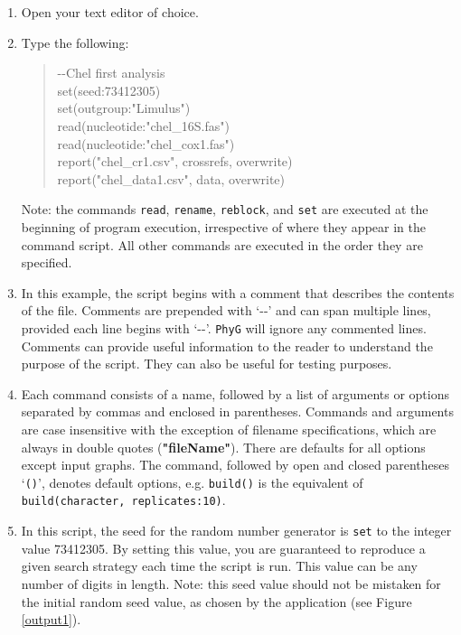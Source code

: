 \documentclass[11pt]{article}
\newcommand{\phyg}{\texttt{PhyG} }
\begin{document}
\begin{enumerate}

\item Open your text editor of choice.

\item Type the following:
	
	\begin{quote}
	-\/-Chel first analysis\\
	set(seed:73412305)\\
	set(outgroup:"Limulus")\\
	read(nucleotide:"chel\_16S.fas")\\
	read(nucleotide:"chel\_cox1.fas")\\
	report("chel\_cr1.csv", crossrefs, overwrite)\\
	report("chel\_data1.csv", data, overwrite)\\
	\end{quote}

Note: the commands \texttt{read}, \texttt{rename}, \texttt{reblock}, and \texttt{set} 
are executed at the beginning of program execution, irrespective of where they 
appear in the command script. All other commands are executed in the order they 
are specified.

\item In this example, the script begins with a comment that describes the 
contents of the file. Comments are prepended with `-{}-' and can span multiple 
lines, provided each line begins with `-{}-'. \phyg will ignore any commented 
lines. Comments can provide useful information to the reader to understand 
the purpose of the script. They can also be useful for testing purposes.

\item Each command consists of a name, followed by a list of arguments or options 
separated by commas and enclosed in parentheses. Commands and arguments are 
case insensitive with the exception of filename specifications, which are always in 
double quotes (\textbf{"fileName"}). There are defaults for all options except 
input graphs. The command, followed by open and closed parentheses `\texttt{()}',
denotes default options, e.g. \texttt{build()} is the equivalent of \texttt{build(character, 
replicates:10)}.

\item In this script, the seed for the random number generator is \texttt{set} to 
the integer value 73412305. By setting this value, you are guaranteed to reproduce 
a given search strategy each time the script is run. This value can be any number of 
digits in length. Note: this seed value should not be mistaken for the initial random
seed value, as chosen by the application (see Figure \ref{output1}).


\end{enumerate}
\end{document}
